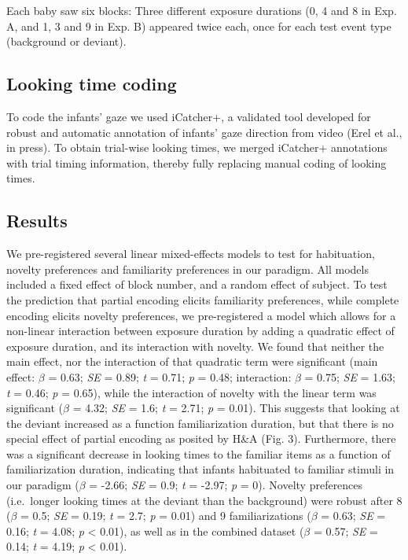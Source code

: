 \documentclass[10pt, letterpaper]{article}
\begin{document}
Each baby saw six blocks: Three different exposure durations (0, 4 and 8
in Exp. A, and 1, 3 and 9 in Exp. B) appeared twice each, once for each
test event type (background or deviant).

\hypertarget{looking-time-coding}{%
\subsection{Looking time coding}\label{looking-time-coding}}

To code the infants' gaze we used iCatcher+, a validated tool developed
for robust and automatic annotation of infants' gaze direction from
video (Erel et al., in press). To obtain trial-wise looking times, we
merged iCatcher+ annotations with trial timing information, thereby
fully replacing manual coding of looking times.

\hypertarget{results-1}{%
\subsection{Results}\label{results-1}}

We pre-registered several linear mixed-effects models to test for
habituation, novelty preferences and familiarity preferences in our
paradigm. All models included a fixed effect of block number, and a
random effect of subject. To test the prediction that partial encoding
elicits familiarity preferences, while complete encoding elicits novelty
preferences, we pre-registered a model which allows for a non-linear
interaction between exposure duration by adding a quadratic effect of
exposure duration, and its interaction with novelty. We found that
neither the main effect, nor the interaction of that quadratic term were
significant (main effect: \(\beta\) = 0.63; \emph{SE} = 0.89; \emph{t} =
0.71; \emph{p} = 0.48; interaction: \(\beta\) = 0.75; \emph{SE} = 1.63;
\emph{t} = 0.46; \emph{p} = 0.65), while the interaction of novelty with
the linear term was significant (\(\beta\) = 4.32; \emph{SE} = 1.6;
\emph{t} = 2.71; \emph{p} = 0.01). This suggests that looking at the
deviant increased as a function familiarization duration, but that there
is no special effect of partial encoding as posited by H\&A (Fig. 3).
Furthermore, there was a significant decrease in looking times to the
familiar items as a function of familiarization duration, indicating
that infants habituated to familiar stimuli in our paradigm (\(\beta\) =
-2.66; \emph{SE} = 0.9; \emph{t} = -2.97; \emph{p} = 0). Novelty
preferences (i.e.~longer looking times at the deviant than the
background) were robust after 8 (\(\beta\) = 0.5; \emph{SE} = 0.19;
\emph{t} = 2.7; \emph{p} = 0.01) and 9 familiarizations (\(\beta\) =
0.63; \emph{SE} = 0.16; \emph{t} = 4.08; \emph{p} \textless{} 0.01), as
well as in the combined dataset (\(\beta\) = 0.57; \emph{SE} = 0.14;
\emph{t} = 4.19; \emph{p} \textless{} 0.01).
\end{document}
